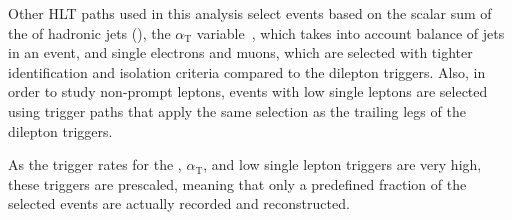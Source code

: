 Other HLT paths used in this analysis select events based on the scalar sum of the \pt of hadronic jets (\HT), the $\alpha_{\mathrm{T}}$ variable~\cite{Khachatryan2011196}, which takes into account balance of jets in an event, and single electrons and muons, which are selected with tighter identification and isolation criteria compared to the dilepton triggers. Also, in order to study non-prompt leptons, events with low \pt single leptons are selected using trigger paths that apply the same selection as the trailing legs of the dilepton triggers. 

As the trigger rates for the \HT, $\alpha_{\mathrm{T}}$, and low \pt single lepton triggers are very high, these triggers are prescaled, meaning that only a predefined fraction of the selected events are actually recorded and reconstructed.

  


